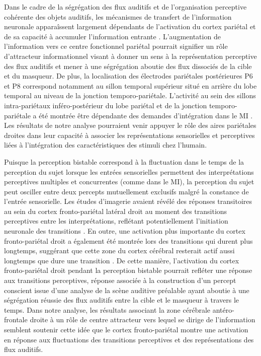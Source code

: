 Dans le cadre de la ségrégation des flux auditifs et de l'organisation perceptive cohérente des objets auditifs, les mécanismes de transfert de l'information neuronale apparaîssent largement dépendants de l'activation du cortex pariétal et de sa capacité à accumuler l'information entrante \citep{overath2007information, pereira2021evidence}. 
L'augmentation de l'information vers ce centre fonctionnel pariétal pourrait signifier un rôle d'attracteur informationnel visant à donner un sens à la représentation perceptive des flux auditifs et mener à une ségrégation aboutie des flux dissociés de la cible et du masqueur. 
De plus, la localisation des électrodes pariétales postérieures P6 et P8 correspond notamment au sillon temporal supérieur situé en arrière du lobe temporal au niveau de la jonction temporo-pariétale. 
L'activité au sein des sillons intra-pariétaux inféro-postérieur du lobe pariétal et de la jonction temporo-pariétale a été montrée être dépendante des demandes d'intégration dans le MI \citep{eriksson2017activity}. 
Les résultats de notre analyse pourraient venir appuyer le rôle des aires pariétales droites dans leur capacité à associer les représentations sensorielles et perceptives liées à l'intégration des caractéristiques des stimuli chez l'humain. 

Puisque la perception bistable correspond à la fluctuation dans le temps de la perception du sujet lorsque les entrées sensorielles permettent des interprétations perceptives multiples et concurrentes (comme dans le MI), la perception du sujet peut osciller entre deux percepts mutuellement exclusifs malgré la constance de l'entrée sensorielle. 
Les études d'imagerie avaient révélé des réponses transitoires au sein du cortex fronto-pariétal latéral droit au moment des transitions perceptives entre les interprétations, reflétant potentiellement l'initiation neuronale des transitions \citep{kleinschmidt2002human, lumer1998neural, sterzer2007neural}. 
En outre, une activation plus importante du cortex fronto-pariétal droit a également été montrée lors des transitions qui durent plus longtemps, suggérant que cette zone du cortex cérébral resterait actif aussi longtemps que dure une transition \citep{knapen2011role}. 
De cette manière, l'activation du cortex fronto-pariétal droit pendant la perception bistable pourrait refléter une réponse aux transitions perceptives, réponse associée à la construction d'un percept conscient issue d'une analyse de la scène auditive préalable ayant aboutie à une ségrégation réussie des flux auditifs entre la cible et le masqueur à travers le temps.  
Dans notre analyse, les résultats associant la zone cérébrale antéro-frontale droite à un rôle de centre attracteur vers lequel se dirige de l'information semblent soutenir cette idée que le cortex fronto-pariétal montre une activation en réponse aux fluctuations des transitions perceptives et des représentations des flux auditifs. 

